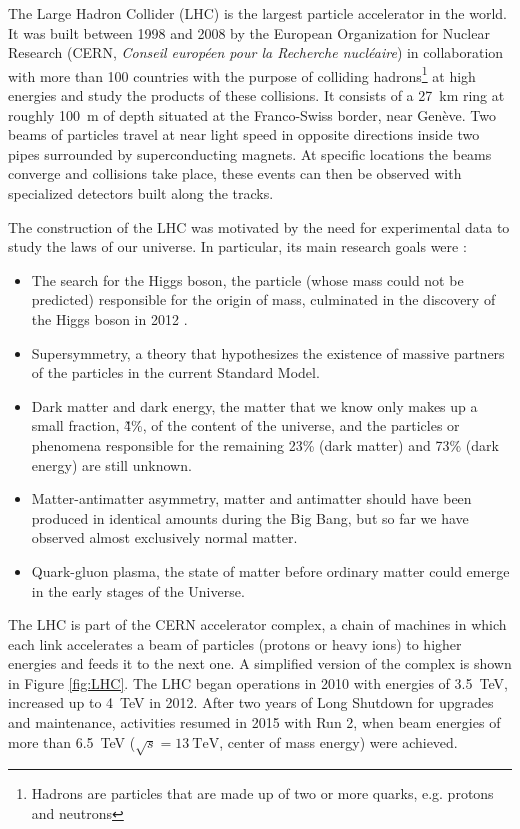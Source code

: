 The Large Hadron Collider (LHC) is the largest particle accelerator in the world. It was built between 1998 and 2008 by the European Organization for Nuclear Research (CERN, \textit{Conseil européen pour la Recherche nucléaire}) in collaboration with more than 100 countries with the purpose of colliding hadrons\footnote{\label{footnote:hadrons}Hadrons are particles that are made up of two or more quarks, e.g. protons and neutrons} at high energies and study the products of these collisions. It consists of a \qty{27}{\kilo\meter} ring at roughly \qty{100}{\meter} of depth situated at the Franco-Swiss border, near Genève. Two beams of particles travel at near light speed in opposite directions inside two pipes surrounded by superconducting magnets. At specific locations the beams converge and collisions take place, these events can then be observed with specialized detectors built along the tracks.

The construction of the LHC was motivated by the need for experimental data to study the laws of our universe. In particular, its main research goals were \cite{homeFactsFigures}:
\begin{itemize}
    \item The search for the Higgs boson, the particle (whose mass could not be predicted) responsible for the origin of mass, culminated in the discovery of the Higgs boson in 2012 \cite{20121}. 
    \item Supersymmetry, a theory that hypothesizes the existence of massive partners of the particles in the current Standard Model.
    \item Dark matter and dark energy, the matter that we know only makes up a small fraction, \~4\%, of the content of the universe, and the particles or phenomena responsible for the remaining 23\% (dark matter) and 73\% (dark energy) are still unknown.
    \item Matter-antimatter asymmetry, matter and antimatter should have been produced in identical amounts during the Big Bang, but so far we have observed almost exclusively normal matter.
    \item Quark-gluon plasma, the state of matter before ordinary matter could emerge in the early stages of the Universe.
\end{itemize}

The LHC is part of the CERN accelerator complex, a chain of machines in which each link accelerates a beam of particles (protons or heavy ions) to higher energies and feeds it to the next one. A simplified version of the complex is shown in Figure \ref{fig:LHC}. The LHC began operations in 2010 with energies of \qty{3.5}{\tera\electronvolt}, increased up to \qty{4}{\tera\electronvolt} in 2012. After two years of Long Shutdown for upgrades and maintenance, activities resumed in 2015 with Run 2, when beam energies of more than \qty{6.5}{\tera\electronvolt} ($\sqrt{s}=\qty{13}{\tera\electronvolt}$, center of mass energy) were achieved.


